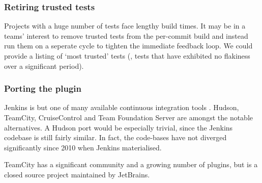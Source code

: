 \subsubsection{Retiring trusted tests}

Projects with a huge number of tests face lengthy build times. It may be in a teams' interest to remove trusted tests from the per-commit build and instead run them on a seperate cycle to tighten the immediate feedback loop. We could provide a listing of {\lq}most trusted{\rq} tests (\ie, tests that have exhibited no flakiness over a significant period).

\subsubsection{Porting the plugin}

Jenkins is but one of many available continuous integration tools \cite{ContinuousIntegrationSoftware}. Hudson, TeamCity, CruiseControl and Team Foundation Server are amongst the notable alternatives. A Hudson port would be especially trivial, since the Jenkins codebase is still fairly similar. In fact, the code-bases have not diverged significantly since 2010 when Jenkins materialised.

TeamCity \cite{TeamCity} has a significant community and a growing number of plugins, but is a closed source project maintained by JetBrains.

